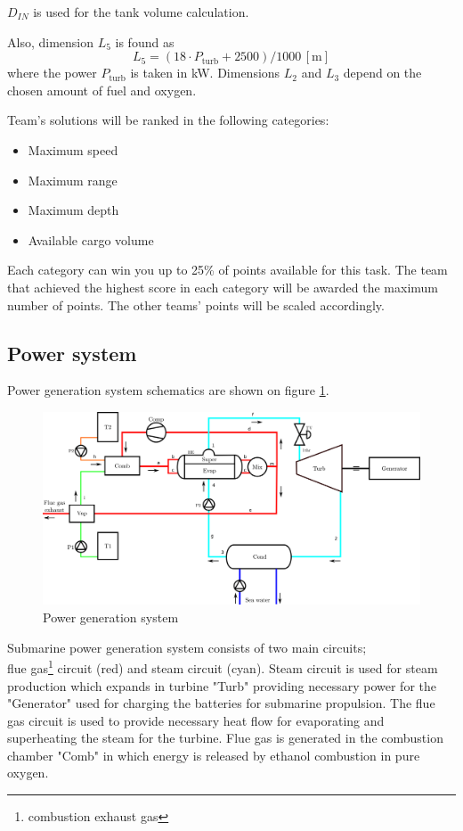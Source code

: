 \documentclass[openany]{book}
\begin{document}
	$D_{IN}$  is used for the tank volume calculation.
	
	Also, dimension $L_5$ is found as
	\begin{equation}
	L_5 = (18 \cdot P_\textrm{turb} + 2500)/1000 \,\left[\textrm{m}\right]
	\end{equation}
	where the power $P_\textrm{turb}$ is taken in kW. Dimensions $L_2$ and 
	$L_3$ depend on the chosen amount of fuel and oxygen.
	
	Team's solutions will be ranked in the following categories:
	\begin{itemize}
		\item Maximum speed
		\item Maximum range
		\item Maximum depth
		\item Available cargo volume
	\end{itemize}
	Each category can win you up to 25\% of points available for this task. The 
	team that achieved the highest score in each category will be awarded the 
	maximum number of points. The other teams' points will be scaled 
	accordingly.
	
	
	
	\subsection{Power system}
	
	Power generation system schematics are shown on figure \ref{fig:pwr_scheme}.
	
	\begin{figure}[h!]
		\centering
		\includegraphics[width=\textwidth]{terma.png}
		\caption{Power generation system}
		\label{fig:pwr_scheme}
	\end{figure}
	
	Submarine power generation system consists of two main circuits; \\
	flue gas\footnote{combustion exhaust gas} circuit (red) and steam 
	circuit (cyan). 
	Steam circuit is used for steam production which expands in turbine "Turb" 
	providing necessary power for the "Generator" used for charging the 
	batteries for submarine propulsion. The flue gas circuit is used to provide 
	necessary heat flow for evaporating and superheating the steam for the 
	turbine. Flue gas is generated in the combustion chamber "Comb" in which 
	energy is released by ethanol combustion in pure oxygen.
	
\end{document}
